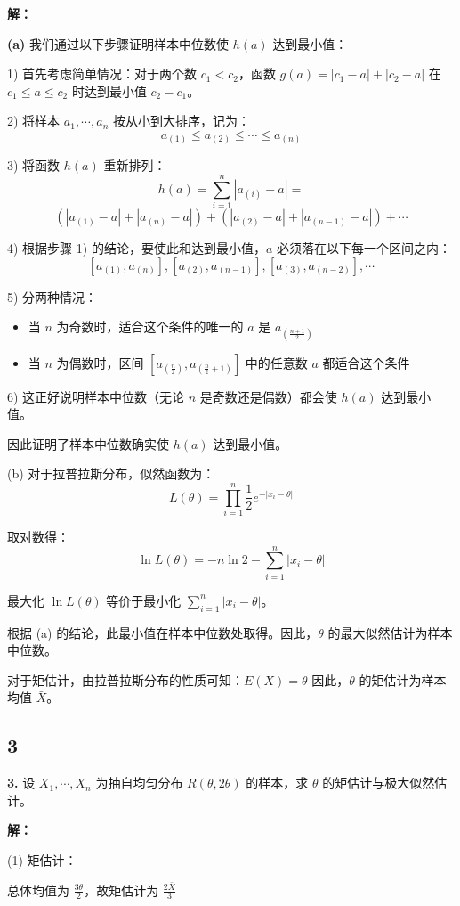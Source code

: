 \documentclass[UTF8]{report}
\theoremstyle{MyLineTheoremStyle} %
\theoremstyle{MyBlockTheoremStyle} %
\theoremstyle{MySubsubsectionStyle} %
\begin{document}
\textbf{解：}

\textbf{(a)} 我们通过以下步骤证明样本中位数使 $h(a)$ 达到最小值：

1) 首先考虑简单情况：对于两个数 $c_1 < c_2$，函数 $g(a)=|c_1-a|+|c_2-a|$ 在 $c_1 \leq a \leq c_2$ 时达到最小值 $c_2-c_1$。

2) 将样本 $a_1,\cdots,a_n$ 按从小到大排序，记为：
   \[a_{(1)} \leq a_{(2)} \leq \cdots \leq a_{(n)}\]

3) 将函数 $h(a)$ 重新排列：
   \[h(a) = \sum_{i=1}^n|a_{(i)}-a| = \]
   \[(|a_{(1)}-a|+|a_{(n)}-a|)+(|a_{(2)}-a|+|a_{(n-1)}-a|)+\cdots\]

4) 根据步骤 1) 的结论，要使此和达到最小值，$a$ 必须落在以下每一个区间之内：
   \[[a_{(1)},a_{(n)}], [a_{(2)},a_{(n-1)}], [a_{(3)},a_{(n-2)}], \cdots\]

5) 分两种情况：
   \begin{itemize}
   \item 当 $n$ 为奇数时，适合这个条件的唯一的 $a$ 是 $a_{(\frac{n+1}{2})}$
   \item 当 $n$ 为偶数时，区间 $[a_{(\frac{n}{2})},a_{(\frac{n}{2}+1)}]$ 中的任意数 $a$ 都适合这个条件
   \end{itemize}

6) 这正好说明样本中位数（无论 $n$ 是奇数还是偶数）都会使 $h(a)$ 达到最小值。

因此证明了样本中位数确实使 $h(a)$ 达到最小值。

(b) 对于拉普拉斯分布，似然函数为：
\[L(\theta) = \prod_{i=1}^n\frac{1}{2}e^{-|x_i-\theta|}\]

取对数得：
\[\ln L(\theta) = -n\ln 2 - \sum_{i=1}^n|x_i-\theta|\]

最大化 $\ln L(\theta)$ 等价于最小化 $\sum_{i=1}^n|x_i-\theta|$。

根据 (a) 的结论，此最小值在样本中位数处取得。因此，$\theta$ 的最大似然估计为样本中位数。

对于矩估计，由拉普拉斯分布的性质可知：$E(X)=\theta$
因此，$\theta$ 的矩估计为样本均值 $\bar{X}$。


\subsection{3}
\textbf{3.} 设 $X_1,\cdots,X_n$ 为抽自均匀分布 $R(\theta,2\theta)$ 的样本，求 $\theta$ 的矩估计与极大似然估计。

\noindent \textbf{解：}

(1) 矩估计：

总体均值为 $\frac{3\theta}{2}$，故矩估计为 $\frac{2\bar{X}}{3}$
\end{document}
